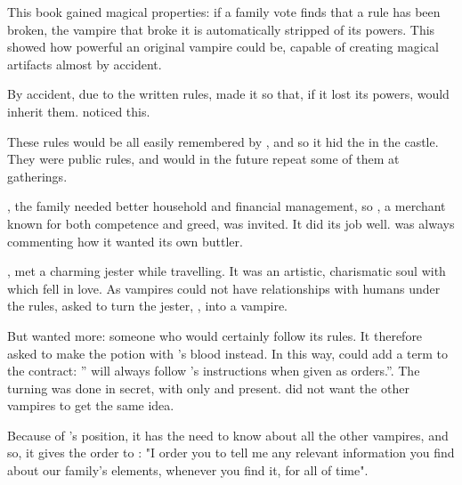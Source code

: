 This book gained magical properties: if a family vote finds that a rule has been broken, the vampire that broke it is automatically stripped of its powers. This showed  how powerful an original vampire could be, capable of creating magical artifacts almost by accident.

By accident, due to the written rules,  made it so that, if it lost its powers,  would inherit them.  noticed this.


These rules would be all easily remembered by , and so it hid the  in the castle. They were public rules, and  would in the future repeat some of them at gatherings.


, the family needed better household and financial management, so , a merchant known for both competence and greed, was invited. It did its job well.  was always commenting how it wanted its own buttler.

,  met a charming jester while travelling. It was an artistic, charismatic soul with which  fell in love. As vampires could not have relationships with humans under the rules,  asked  to turn the jester, , into a vampire.

But  wanted more: someone who would certainly follow its rules. It therefore asked  to make the potion with 's blood instead. In this way,  could add a term to the contract: '' will always follow 's instructions when given as orders.''. The turning was done in secret, with only  and  present.  did not want the other vampires to get the same idea.

Because of 's position, it has the need to know about all the other vampires, and so, it gives the order to : "I order you to tell me any relevant information you find about our family's elements, whenever you find it, for all of time".

